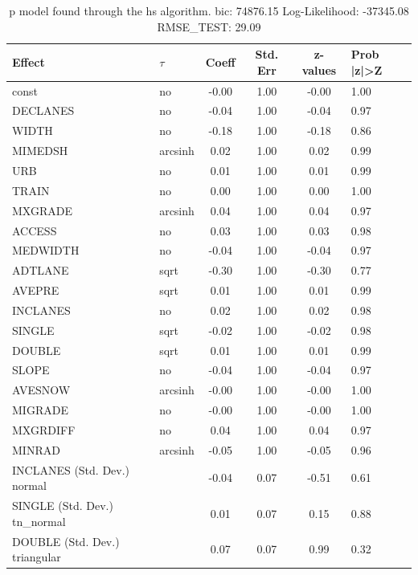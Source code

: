 \begin{table}
	\caption{p model found through the hs algorithm. bic: 74876.15 Log-Likelihood: -37345.08 RMSE_TEST: 29.09}
	\begin{center}
		\begin{tabular}{|l|l|c|c|c|l|}
			\hline
			Effect & $\tau$ & Coeff & Std. Err & z-values & Prob |z|>Z \\
			\hline
			const & no & -0.00 & 1.00 & -0.00 & 1.00 \\
			\hline
			DECLANES & no & -0.04 & 1.00 & -0.04 & 0.97 \\
			\hline
			WIDTH & no & -0.18 & 1.00 & -0.18 & 0.86 \\
			\hline
			MIMEDSH & arcsinh & 0.02 & 1.00 & 0.02 & 0.99 \\
			\hline
			URB & no & 0.01 & 1.00 & 0.01 & 0.99 \\
			\hline
			TRAIN & no & 0.00 & 1.00 & 0.00 & 1.00 \\
			\hline
			MXGRADE & arcsinh & 0.04 & 1.00 & 0.04 & 0.97 \\
			\hline
			ACCESS & no & 0.03 & 1.00 & 0.03 & 0.98 \\
			\hline
			MEDWIDTH & no & -0.04 & 1.00 & -0.04 & 0.97 \\
			\hline
			ADTLANE & sqrt & -0.30 & 1.00 & -0.30 & 0.77 \\
			\hline
			AVEPRE & sqrt & 0.01 & 1.00 & 0.01 & 0.99 \\
			\hline
			INCLANES & no & 0.02 & 1.00 & 0.02 & 0.98 \\
			\hline
			SINGLE & sqrt & -0.02 & 1.00 & -0.02 & 0.98 \\
			\hline
			DOUBLE & sqrt & 0.01 & 1.00 & 0.01 & 0.99 \\
			\hline
			SLOPE & no & -0.04 & 1.00 & -0.04 & 0.97 \\
			\hline
			AVESNOW & arcsinh & -0.00 & 1.00 & -0.00 & 1.00 \\
			\hline
			MIGRADE & no & -0.00 & 1.00 & -0.00 & 1.00 \\
			\hline
			MXGRDIFF & no & 0.04 & 1.00 & 0.04 & 0.97 \\
			\hline
			MINRAD & arcsinh & -0.05 & 1.00 & -0.05 & 0.96 \\
			\hline
			INCLANES (Std. Dev.) normal &  & -0.04 & 0.07 & -0.51 & 0.61 \\
			\hline
			SINGLE (Std. Dev.) tn_normal &  & 0.01 & 0.07 & 0.15 & 0.88 \\
			\hline
			DOUBLE (Std. Dev.) triangular &  & 0.07 & 0.07 & 0.99 & 0.32 \\

\end{tabular}
\end{center}
\end{table}
